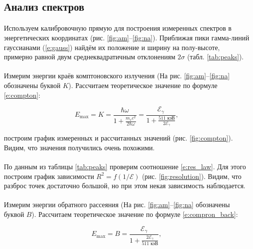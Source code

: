 \documentclass[a4paper,12pt]{article} %
\begin{document}
\subsection{Анализ спектров}

\paragraph{}Используем калибровочную прямую для построения измеренных спектров в энергетических координатах (рис. \ref{fig:am}--\ref{fig:na}). Приближая пики гамма-линий гауссианами (\ref{e:gauss}) найдём их положение и ширину на полу-высоте, примерно равной двум среднеквадратичным отклонениям $2\sigma$ (табл. \ref{tab:peaks}). 

\paragraph{}Измерим энергии краёв комптоновского излучения (На рис. \ref{fig:am}--\ref{fig:na} обозначены буквой $K$). Рассчитаем теоретическое значение по формуле \eqref{e:compton}:

\begin{equation}
E_{\max} = K = \frac{\hbar \omega}{1 + \frac{m_e c^2}{2 \hbar \omega}} = \frac{\mathcal{E}_\gamma}{1 + \frac{511 \text{ кэВ}}{2 \mathcal{E}_\gamma}},
\end{equation}

\noindent построим график измеренных и рассчитанных значений (рис. \ref{fig:compton}). Видим, что значения получились очень похожими.

\paragraph{}По данным из таблицы \ref{tab:peaks} проверим соотношение \eqref{e:res_law}. Для этого построим график зависимости $R^2 = f(1/\mathcal{E})$ (рис. \ref{fig:resolution}). Видим, что разброс точек достаточно большой, но при этом некая зависимость наблюдается.

\paragraph{}Измерим энергии обратного рассеяния (На рис. \ref{fig:am}--\ref{fig:na} обозначены буквой $B$). Рассчитаем теоретическое значение по формуле \eqref{e:compron_back}:

\begin{equation}
E_{\max} = B = \frac{\mathcal{E}_\gamma}{1 + \frac{2 \mathcal{E}_\gamma}{511 \text{ кэВ}}},
\end{equation}
\end{document}
